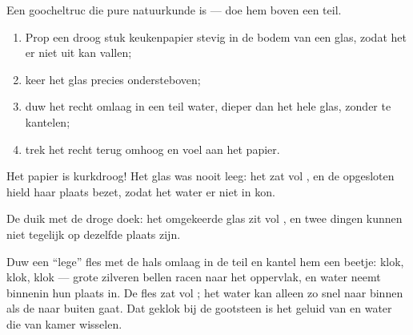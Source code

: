 \begin{method}\label{met:g2:air-around-us:drytowel}
Een goocheltruc die pure natuurkunde is --- doe hem boven een teil.
\begin{enumerate}
  \item Prop een droog stuk keukenpapier stevig in de bodem van een
        glas, zodat het er niet uit kan vallen;
  \item keer het glas precies ondersteboven;
  \item duw het recht omlaag in een teil water, dieper dan het hele
        glas, zonder te kantelen;
  \item trek het recht terug omhoog en voel aan het papier.
\end{enumerate}
Het papier is kurkdroog! Het glas was nooit leeg: het zat vol
, en de opgesloten  hield haar plaats bezet, zodat het
water er niet in kon.
\end{method}

\begin{omfigure}

{\small De duik met de droge doek: het omgekeerde glas zit vol
, en twee dingen kunnen niet tegelijk op dezelfde plaats zijn.}
\end{omfigure}

\begin{example}\label{ex:g2:air-around-us:glug}
Duw een ``lege'' fles met de hals omlaag in de teil en kantel hem een
beetje: klok, klok, klok --- grote zilveren bellen racen naar het
oppervlak, en water neemt binnenin hun plaats in. De fles zat vol
; het water kan alleen zo snel naar binnen als de  naar
buiten gaat. Dat geklok bij de gootsteen is het geluid van
 en water die van kamer wisselen.
\end{example}

